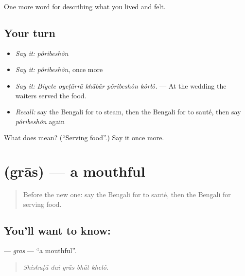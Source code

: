 \begin{grammarlens}[title={What you've built}]
One more word for describing what you lived and felt.
\end{grammarlens}

\subsection*{Your turn}
\begin{itemize}
\raggedright
  \item \emph{Say it:} \emph{pôribeshôn}
  \item \emph{Say it:} \emph{pôribeshôn}, once more
  \item \emph{Say it:} \emph{Biyete oyeṭārrā khābār pôribeshôn kôrlô.} — At the wedding the waiters served the food.
  \item \emph{Recall:} say the Bengali for to steam, then the Bengali for to sauté, then say \emph{pôribeshôn} again
\end{itemize}

\begin{tcolorbox}[breakable,colback=teal!4,colframe=teal!35!black,title={Before you move on}]
What does  mean? (\textquotedblleft{}Serving food\textquotedblright{}.) Say it once more.
\end{tcolorbox}
\section[\texorpdfstring{\bn{গ্রাস} (grās)}{গ্রাস (grās)}]{ (grās) — a mouthful}

\label{lesson:BN-C515-gras}



\begin{quote}
Before the new one: say the Bengali for to sauté, then the Bengali for serving food.
\end{quote}

\subsection*{You'll want to know: }
\textbf{} — \emph{grās} — \textquotedblleft{}a mouthful\textquotedblright{}.

\begin{quote}
    
\end{quote}

\begin{quote}
\emph{Shishuṭā dui grās bhāt khelô.}
\end{quote}

